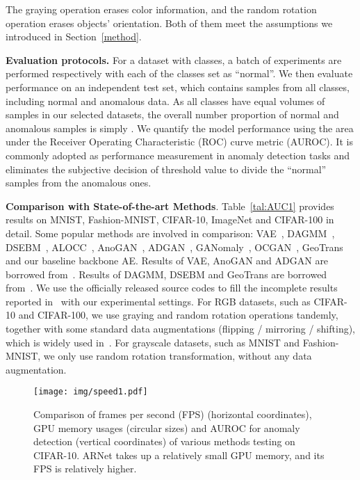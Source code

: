 \documentclass[journal]{IEEEtran}
\begin{document}
The graying operation erases color information, and the random rotation operation erases objects' orientation. Both of them meet the assumptions we introduced in Section~\ref{method}. 

\noindent\textbf{Evaluation protocols.} 
For a dataset with  classes, a batch of  experiments are performed respectively with each of the  classes set as ``normal''. We then evaluate performance on an independent test set, which contains samples from all classes, including normal and anomalous data. As all classes have equal volumes of samples in our selected datasets, the overall number proportion of normal and anomalous samples is simply . 
We quantify the model performance using the area under the Receiver Operating Characteristic (ROC) curve metric (AUROC). It is commonly adopted as performance measurement in anomaly detection tasks and eliminates the subjective decision of threshold value to divide the ``normal'' samples from the anomalous ones. 

\noindent \textbf{Comparison with State-of-the-art Methods}.
Table~\ref{tal:AUC1} provides results on MNIST, Fashion-MNIST, CIFAR-10, ImageNet and CIFAR-100 in detail. Some popular methods are involved in comparison: VAE~\cite{kingma2013auto}, DAGMM~\cite{zhai2016deep}, DSEBM~\cite{zong2018deep},
ALOCC~\cite{Sabokrou2018Adversarially}, AnoGAN~\cite{schlegl2017unsupervised}, ADGAN~\cite{deecke2018image}, GANomaly~\cite{Akcay2018}, OCGAN~\cite{perera2019ocgan}, GeoTrans~\cite{golan2018deep} and our baseline backbone AE. Results of VAE, AnoGAN and ADGAN are borrowed from~\cite{deecke2018image}. 
Results of DAGMM, DSEBM and GeoTrans are borrowed from~\cite{golan2018deep}. We use the officially released source codes to fill the incomplete results reported in~\cite{Sabokrou2018Adversarially,Akcay2018} with our experimental settings. For RGB datasets, such as CIFAR-10 and CIFAR-100, we use graying and random rotation operations tandemly, together with some standard data augmentations (flipping / mirroring / shifting), which is widely used in~\cite{he2016deep, huang2017densely}. For grayscale datasets, such as MNIST and Fashion-MNIST, we only use random rotation transformation, without any data augmentation. 

\begin{figure}[tbp]
\centering
\texttt{[image: img/speed1.pdf]}
\caption{Comparison of frames per second (FPS) (horizontal coordinates), GPU memory usages (circular sizes) and AUROC for anomaly detection (vertical coordinates) of various methods testing on CIFAR-10. ARNet takes up a relatively small GPU memory, and its FPS is relatively higher.}
\label{img:speed}
\end{figure}
\end{document}
